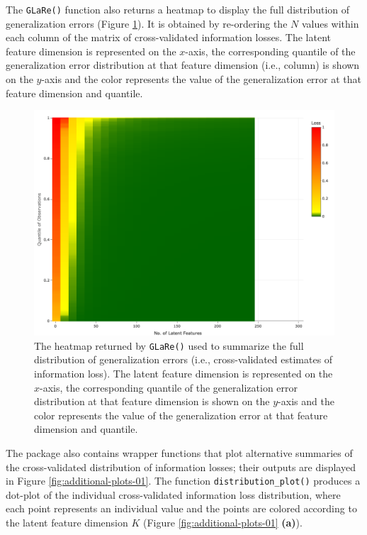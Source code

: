 The \texttt{GLaRe()} function also returns a heatmap to display the full distribution of generalization errors (Figure \ref{fig:eye-heatmap}).
It is obtained by re-ordering the $N$ values within each column of the matrix of cross-validated information losses.
The latent feature dimension is represented on the $x$-axis, the corresponding quantile of the generalization error distribution at that feature dimension (i.e., column) is shown on the $y$-axis and the color represents the value of the generalization error at that feature dimension and quantile.


\begin{figure}
    \centering
    \includegraphics[width=0.5\linewidth]{figures/eye-heatmap.png}
    \caption{The heatmap returned by \texttt{GLaRe()} used to summarize the full distribution of generalization errors (i.e., cross-validated estimates of information loss). The latent feature dimension is represented on the $x$-axis, the corresponding quantile of the generalization error distribution at that feature dimension is shown on the $y$-axis and the color represents the value of the generalization error at that feature dimension and quantile.}
    \label{fig:eye-heatmap}
\end{figure}

The  package also contains wrapper functions that plot alternative summaries of the cross-validated distribution of information losses; their outputs are displayed in Figure \ref{fig:additional-plots-01}.
The function \texttt{distribution\_plot()} produces a dot-plot of the individual cross-validated information loss distribution, where each point represents an individual value and the points are colored according to the latent feature dimension $K$ (Figure \ref{fig:additional-plots-01} \textbf{(a)}).

